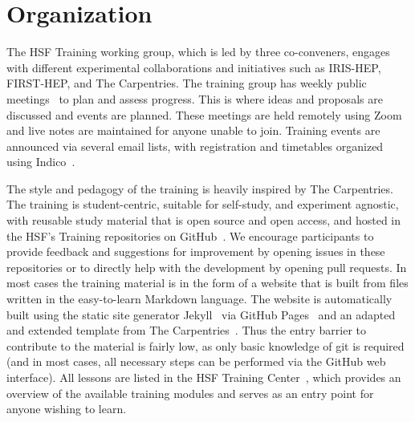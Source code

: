 \documentclass[twocolumn]{svjour3}          %
\begin{document}
\section{Organization }\label{sec:Organisation}
%
The HSF Training working group, which is led by three co-conveners, engages with different experimental collaborations and initiatives such as IRIS-HEP, FIRST-HEP, and The Carpentries. The training group has weekly public meetings~\cite{HSF-training-meetings} to plan and assess progress. This is where ideas and proposals are discussed and events are planned. These meetings are held remotely using Zoom and live notes are maintained for anyone unable to join. Training events are announced via several email lists, with registration and timetables organized using  Indico~\cite{HSF-training-events}.

The style and pedagogy of the training is heavily inspired by The Carpentries.
The training is student-centric, suitable for self-study, and experiment agnostic, with reusable study material that is open source and open access, and hosted in the HSF's Training repositories on  GitHub~\cite{HSF-training-materials}. We encourage participants to provide feedback and suggestions for improvement by opening issues in these repositories or to directly help with the development by opening pull requests.
In most cases the training material is in the form of a website that is built from files written in the easy-to-learn Markdown language. The website is automatically built using the static site generator Jekyll~\cite{jekyll} via GitHub Pages~\cite{github-pages} and an adapted and extended template from The Carpentries~\cite{hsf-styles,carpentry-styles}. Thus the entry barrier to contribute to the material is fairly low, as only basic knowledge of git is required (and in most cases, all necessary steps can be performed via the GitHub web interface).
All lessons are listed in the HSF Training Center~\cite{HSF-curriculum}, which provides an overview of the available training modules and serves as an entry point for anyone wishing to learn.
\end{document}
